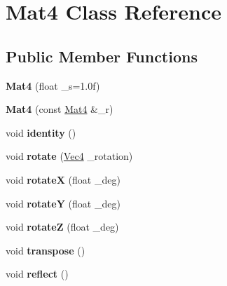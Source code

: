 \hypertarget{classMat4}{\section{Mat4 Class Reference}
\label{classMat4}
}
\subsection*{Public Member Functions}
\begin{DoxyCompactItemize}
\item 
\hypertarget{classMat4_ae58e837dcd44249fadedacea016546be}{{\bfseries Mat4} (float \-\_\-s=1.\-0f)}\label{classMat4_ae58e837dcd44249fadedacea016546be}

\item 
\hypertarget{classMat4_a60d41e4464b7fea47fc333a1eabed96d}{{\bfseries Mat4} (const \hyperlink{classMat4}{Mat4} \&\-\_\-r)}\label{classMat4_a60d41e4464b7fea47fc333a1eabed96d}

\item 
\hypertarget{classMat4_ad4a8d1caecbfd18a61a9fe245e7463ab}{void {\bfseries identity} ()}\label{classMat4_ad4a8d1caecbfd18a61a9fe245e7463ab}

\item 
\hypertarget{classMat4_acb9ad11f7dc9e9ba38725471ddd04ad2}{void {\bfseries rotate} (\hyperlink{classVec4}{Vec4} \-\_\-rotation)}\label{classMat4_acb9ad11f7dc9e9ba38725471ddd04ad2}

\item 
\hypertarget{classMat4_afc96b3d0d911d07988124657beca37fc}{void {\bfseries rotate\-X} (float \-\_\-deg)}\label{classMat4_afc96b3d0d911d07988124657beca37fc}

\item 
\hypertarget{classMat4_a00a1def220f8149c3034fad00d7fad6c}{void {\bfseries rotate\-Y} (float \-\_\-deg)}\label{classMat4_a00a1def220f8149c3034fad00d7fad6c}

\item 
\hypertarget{classMat4_a91f70b0955b5465ca2c30efc7d80f400}{void {\bfseries rotate\-Z} (float \-\_\-deg)}\label{classMat4_a91f70b0955b5465ca2c30efc7d80f400}

\item 
\hypertarget{classMat4_af8b85ea76f3b7225ee33878029b1d18e}{void {\bfseries transpose} ()}\label{classMat4_af8b85ea76f3b7225ee33878029b1d18e}

\item 
\hypertarget{classMat4_a507036ef6d5b0a6dd7007c1f746c8b00}{void {\bfseries reflect} ()}\label{classMat4_a507036ef6d5b0a6dd7007c1f746c8b00}


\end{DoxyCompactItemize}
